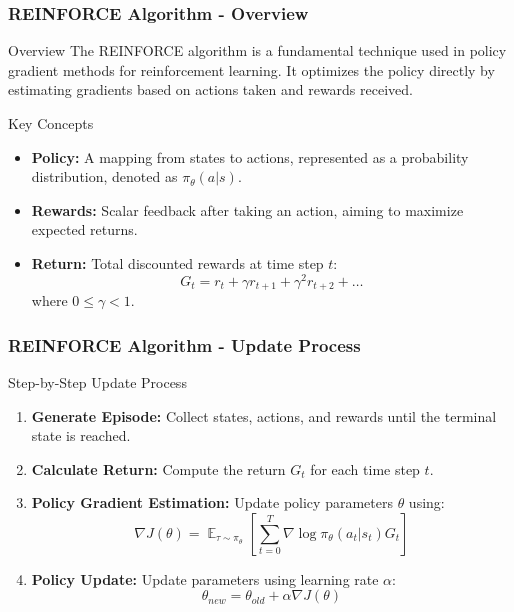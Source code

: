 \documentclass[aspectratio=169]{beamer}
\begin{document}
\begin{frame}[fragile]
    \frametitle{REINFORCE Algorithm - Overview}
    \begin{block}{Overview}
        The REINFORCE algorithm is a fundamental technique used in policy gradient methods for reinforcement learning. It optimizes the policy directly by estimating gradients based on actions taken and rewards received.
    \end{block}
    \begin{block}{Key Concepts}
        \begin{itemize}
            \item \textbf{Policy:} A mapping from states to actions, represented as a probability distribution, denoted as $\pi_\theta(a|s)$.
            \item \textbf{Rewards:} Scalar feedback after taking an action, aiming to maximize expected returns.
            \item \textbf{Return:} Total discounted rewards at time step $t$: 
            \[
            G_t = r_t + \gamma r_{t+1} + \gamma^2 r_{t+2} + \ldots
            \]
            where $0 \leq \gamma < 1$.
        \end{itemize}
    \end{block}
\end{frame}

\begin{frame}[fragile]
    \frametitle{REINFORCE Algorithm - Update Process}
    \begin{block}{Step-by-Step Update Process}
        \begin{enumerate}
            \item \textbf{Generate Episode:} Collect states, actions, and rewards until the terminal state is reached.
            \item \textbf{Calculate Return:} Compute the return $G_t$ for each time step $t$.
            \item \textbf{Policy Gradient Estimation:} Update policy parameters $\theta$ using:
            \[
            \nabla J(\theta) = \mathop{\mathbb{E}}_{\tau \sim \pi_\theta} \left[ \sum_{t=0}^{T} \nabla \log \pi_\theta(a_t | s_t) G_t \right]
            \]
            \item \textbf{Policy Update:} Update parameters using learning rate $\alpha$:
            \[
            \theta_{new} = \theta_{old} + \alpha \nabla J(\theta)
            \]
        \end{enumerate}
    \end{block}
\end{frame}
\end{document}
